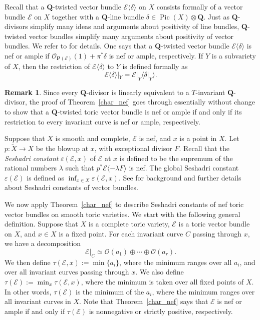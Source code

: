 \documentclass[12pt]{amsart}
\theoremstyle{definition}
\newtheorem{remark}[lemma]{Remark}
\theoremstyle{remark}
\begin{document}
Recall that a ${{\mathbf Q}}$-twisted vector bundle ${\mathcal{E}} {\langle} \delta {\rangle}$ on $X$
consists formally of a vector bundle ${\mathcal{E}}$ on $X$ together with a
${{\mathbf Q}}$-line bundle $\delta \in \operatorname{Pic}(X) \otimes {{\mathbf Q}}$.  Just as
${{\mathbf Q}}$-divisors simplify many ideas and arguments about positivity of
line bundles, ${{\mathbf Q}}$-twisted vector bundles simplify many arguments
about positivity of vector bundles. We refer to
\cite[Section~6.2]{positivity} for details. One says that a
${{\mathbf Q}}$-twisted vector bundle ${\mathcal{E}} {\langle} \delta {\rangle}$ is nef or ample if
${\mathcal{O}}_{{{\mathbf P}}({\mathcal{E}})}(1) + \pi^* \delta$ is nef or ample, respectively. If
$Y$ is a subvariety of $X$, then the restriction of ${\mathcal{E}}{\langle} \delta
{\rangle}$ to $Y$ is defined formally as
\[
{\mathcal{E}}{\langle} \delta {\rangle} |_Y =  {\mathcal{E}}|_Y {\langle} \delta|_Y {\rangle}.
\]

\begin{remark} \label{Q version}
Since every ${{\mathbf Q}}$-divisor is linearly equivalent to a $T$-invariant ${{\mathbf Q}}$-divisor,
the proof of Theorem~\ref{char_nef} goes through essentially without change to show
that a ${{\mathbf Q}}$-twisted toric vector bundle is nef or ample if and only if its restriction to every invariant curve is nef or ample, respectively.
\end{remark}

Suppose that $X$ is smooth and complete, ${\mathcal{E}}$ is nef, and $x$ is a point in $X$.
Let $p\colon \widetilde X \rightarrow X$ be the blowup at $x$, with exceptional divisor $F$.
Recall that the \emph{Seshadri constant} ${\varepsilon}({\mathcal{E}}, x)$ of ${\mathcal{E}}$ at $x$ is defined to be the
supremum of the rational numbers $\lambda$ such that $p^*{\mathcal{E}} {\langle} -\lambda F {\rangle}$ is nef.
The global Seshadri constant ${\varepsilon}({\mathcal{E}})$ is defined as $\inf_{x\in X}{\varepsilon}({\mathcal{E}},x)$.
See \cite{Hacon} for background and further details about Seshadri constants of vector bundles.

We now apply Theorem~\ref{char_nef} to describe Seshadri constants
of nef toric vector bundles on smooth toric varieties. We start with
the following general definition. Suppose that $X$ is a complete toric variety, ${\mathcal{E}}$ is a toric vector bundle on $X$, and $x\in X$
is a fixed point.  For each invariant curve $C$ passing through $x$, we have a decomposition
\[
{\mathcal{E}}|_C \simeq {\mathcal{O}}(a_1) \oplus \cdots \oplus {\mathcal{O}}(a_r).
\]
We then define
$\tau({\mathcal{E}},x):=\min\{a_i\}$, where the minimum ranges over all $a_i$,
and over all invariant curves passing through $x$. We also define
$\tau({\mathcal{E}}):=\min_x\tau({\mathcal{E}},x)$, where the minimum is taken over all
fixed points of $X$. In other words, $\tau({\mathcal{E}})$ is the minimum of the $a_i$,
where the minimum ranges over all invariant curves in $X$.  Note that Theorem~\ref{char_nef} says that
${\mathcal{E}}$ is nef or ample if and only if $\tau({\mathcal{E}})$ is nonnegative or strictly positive, respectively.
\end{document}
